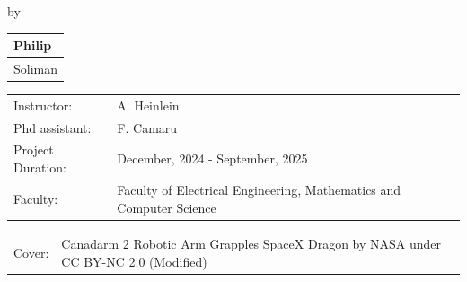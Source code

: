 \begin{titlepage}

    \begin{center}
    
    {\makeatletter
    \largetitlestyle\fontsize{45}{45}\selectfont\@title
    \makeatother}
    
    {\makeatletter
    \ifdefvoid{\@subtitle}{}{\bigskip\titlestyle\fontsize{20}{20}\selectfont\@subtitle}
    \makeatother}
    
    \bigskip
    \bigskip
    
    by
    
    \bigskip
    \bigskip
    
    {\makeatletter
    \largetitlestyle\fontsize{25}{25}\selectfont\@author
    \makeatother}
    
    \bigskip
    \bigskip
    
    \setlength\extrarowheight{2pt}
    \begin{tabular}{l}
        Philip \\\midrule
        Soliman\\
    \end{tabular}
    
    \vfill
    
    \begin{tabular}{ll}
        Instructor: & A. Heinlein \\
        Phd assistant: & F. Camaru \\
        Project Duration: & December, 2024 - September, 2025 \\
        Faculty: & Faculty of Electrical Engineering, Mathematics and Computer Science
    \end{tabular}
    
    \bigskip
    \bigskip
    
    \begin{tabular}{p{15mm}p{10cm}}
        Cover: & Canadarm 2 Robotic Arm Grapples SpaceX Dragon by NASA under CC BY-NC 2.0 (Modified) \\
    \end{tabular}
    

\end{center}
\end{titlepage}
